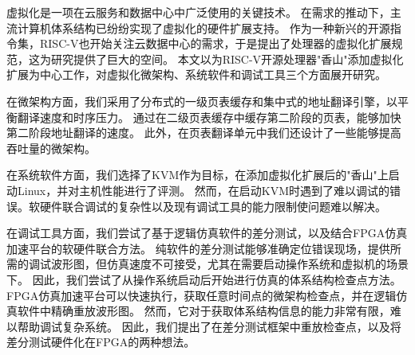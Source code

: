 \begin{cabstract}
虚拟化是一项在云服务和数据中心中广泛使用的关键技术。
在需求的推动下，主流计算机体系结构已纷纷实现了虚拟化的硬件扩展支持。
作为一种新兴的开源指令集，RISC-V也开始关注云数据中心的需求，于是提出了处理器的虚拟化扩展规范，这为研究提供了巨大的空间。
本文以为RISC-V开源处理器"香山"添加虚拟化扩展为中心工作，对虚拟化微架构、系统软件和调试工具三个方面展开研究。

在微架构方面，我们采用了分布式的一级页表缓存和集中式的地址翻译引擎，以平衡翻译速度和时序压力。
通过在二级页表缓存中缓存第二阶段的页表，能够加快第二阶段地址翻译的速度。
此外，在页表翻译单元中我们还设计了一些能够提高吞吐量的微架构。

在系统软件方面，我们选择了KVM作为目标，在添加虚拟化扩展后的"香山"上启动Linux，并对主机性能进行了评测。
然而，在启动KVM时遇到了难以调试的错误。软硬件联合调试的复杂性以及现有调试工具的能力限制使问题难以解决。

在调试工具方面，我们尝试了基于逻辑仿真软件的差分测试，以及结合FPGA仿真加速平台的软硬件联合方法。
纯软件的差分测试能够准确定位错误现场，提供所需的调试波形图，但仿真速度不可接受，尤其在需要启动操作系统和虚拟机的场景下。
因此，我们尝试了从操作系统启动后开始进行仿真的体系结构检查点方法。
FPGA仿真加速平台可以快速执行，获取任意时间点的微架构检查点，并在逻辑仿真软件中精确重放波形图。
然而，它对于获取体系结构信息的能力非常有限，难以帮助调试复杂系统。
因此，我们提出了在差分测试框架中重放检查点，以及将差分测试硬件化在FPGA的两种想法。
\end{cabstract}

